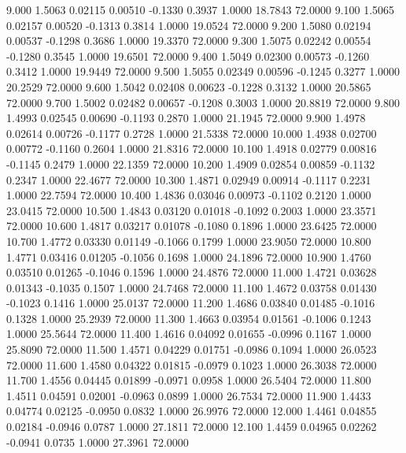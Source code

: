    9.000   1.5063   0.02115   0.00510  -0.1330   0.3937   1.0000  18.7843  72.0000
   9.100   1.5065   0.02157   0.00520  -0.1313   0.3814   1.0000  19.0524  72.0000
   9.200   1.5080   0.02194   0.00537  -0.1298   0.3686   1.0000  19.3370  72.0000
   9.300   1.5075   0.02242   0.00554  -0.1280   0.3545   1.0000  19.6501  72.0000
   9.400   1.5049   0.02300   0.00573  -0.1260   0.3412   1.0000  19.9449  72.0000
   9.500   1.5055   0.02349   0.00596  -0.1245   0.3277   1.0000  20.2529  72.0000
   9.600   1.5042   0.02408   0.00623  -0.1228   0.3132   1.0000  20.5865  72.0000
   9.700   1.5002   0.02482   0.00657  -0.1208   0.3003   1.0000  20.8819  72.0000
   9.800   1.4993   0.02545   0.00690  -0.1193   0.2870   1.0000  21.1945  72.0000
   9.900   1.4978   0.02614   0.00726  -0.1177   0.2728   1.0000  21.5338  72.0000
  10.000   1.4938   0.02700   0.00772  -0.1160   0.2604   1.0000  21.8316  72.0000
  10.100   1.4918   0.02779   0.00816  -0.1145   0.2479   1.0000  22.1359  72.0000
  10.200   1.4909   0.02854   0.00859  -0.1132   0.2347   1.0000  22.4677  72.0000
  10.300   1.4871   0.02949   0.00914  -0.1117   0.2231   1.0000  22.7594  72.0000
  10.400   1.4836   0.03046   0.00973  -0.1102   0.2120   1.0000  23.0415  72.0000
  10.500   1.4843   0.03120   0.01018  -0.1092   0.2003   1.0000  23.3571  72.0000
  10.600   1.4817   0.03217   0.01078  -0.1080   0.1896   1.0000  23.6425  72.0000
  10.700   1.4772   0.03330   0.01149  -0.1066   0.1799   1.0000  23.9050  72.0000
  10.800   1.4771   0.03416   0.01205  -0.1056   0.1698   1.0000  24.1896  72.0000
  10.900   1.4760   0.03510   0.01265  -0.1046   0.1596   1.0000  24.4876  72.0000
  11.000   1.4721   0.03628   0.01343  -0.1035   0.1507   1.0000  24.7468  72.0000
  11.100   1.4672   0.03758   0.01430  -0.1023   0.1416   1.0000  25.0137  72.0000
  11.200   1.4686   0.03840   0.01485  -0.1016   0.1328   1.0000  25.2939  72.0000
  11.300   1.4663   0.03954   0.01561  -0.1006   0.1243   1.0000  25.5644  72.0000
  11.400   1.4616   0.04092   0.01655  -0.0996   0.1167   1.0000  25.8090  72.0000
  11.500   1.4571   0.04229   0.01751  -0.0986   0.1094   1.0000  26.0523  72.0000
  11.600   1.4580   0.04322   0.01815  -0.0979   0.1023   1.0000  26.3038  72.0000
  11.700   1.4556   0.04445   0.01899  -0.0971   0.0958   1.0000  26.5404  72.0000
  11.800   1.4511   0.04591   0.02001  -0.0963   0.0899   1.0000  26.7534  72.0000
  11.900   1.4433   0.04774   0.02125  -0.0950   0.0832   1.0000  26.9976  72.0000
  12.000   1.4461   0.04855   0.02184  -0.0946   0.0787   1.0000  27.1811  72.0000
  12.100   1.4459   0.04965   0.02262  -0.0941   0.0735   1.0000  27.3961  72.0000
